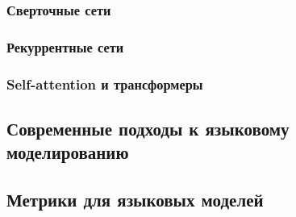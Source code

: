\subsubsection{Сверточные сети}

\subsubsection{Рекуррентные сети}

\subsubsection{Self-attention и трансформеры}

\subsection{Современные подходы к языковому моделированию}
\label{sub:domain:curr}

\subsection{Метрики для языковых моделей}



